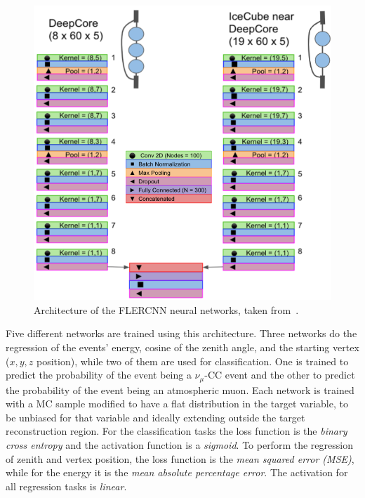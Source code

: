 \begin{figure}
    \includegraphics{figures/simulation_and_processing/flercnn/Detailed_CNN_Architecture_combined.png}
	\caption[FLERCNN architecture]{Architecture of the FLERCNN neural networks, taken from~\cite{flercnn_proceedings}.}
\end{figure}

Five different networks are trained using this architecture. Three networks do the regression of the events' energy, cosine of the zenith angle, and the starting vertex ($x,y,z$ position), while two of them are used for classification. One is trained to predict the probability of the event being a $\nu_\mu$-CC event and the other to predict the probability of the event being an atmospheric muon. Each network is trained with a MC sample modified to have a flat distribution in the target variable, to be unbiased for that variable and ideally extending outside the target reconstruction region. For the classification tasks the loss function is the \textit{binary cross entropy} and the activation function is a \textit{sigmoid}. To perform the regression of zenith and vertex position, the loss function is the \textit{mean squared error (MSE)}, while for the energy it is the \textit{mean absolute percentage error}. The activation for all regression tasks is \textit{linear}.

